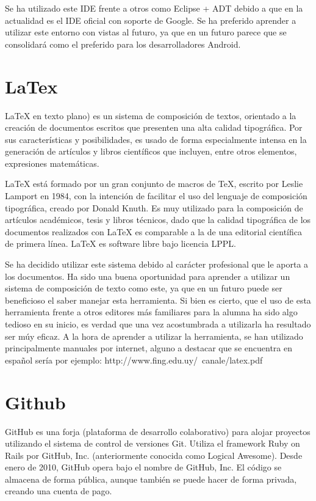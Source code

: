 Se ha utilizado este IDE frente a otros como Eclipse + ADT debido a que en la actualidad es el IDE oficial con soporte de Google. Se ha preferido aprender a utilizar este entorno con vistas al futuro, ya que en un futuro parece que se consolidará como el preferido para los desarrolladores Android.

\section{LaTex}

LaTeX en texto plano) es un sistema de composición de textos, orientado a la creación de documentos escritos que presenten una alta calidad tipográfica. Por sus características y posibilidades, es usado de forma especialmente intensa en la generación de artículos y libros científicos que incluyen, entre otros elementos, expresiones matemáticas.


LaTeX está formado por un gran conjunto de macros de TeX, escrito por Leslie Lamport en 1984, con la intención de facilitar el uso del lenguaje de composición tipográfica, creado por Donald Knuth. Es muy utilizado para la composición de artículos académicos, tesis y libros técnicos, dado que la calidad tipográfica de los documentos realizados con LaTeX es comparable a la de una editorial científica de primera línea. LaTeX es software libre bajo licencia LPPL.


Se ha decidido utilizar este sistema debido al carácter profesional que le aporta a los documentos. Ha sido una buena oportunidad para aprender a utilizar un sistema de composición de texto como este, ya que en un futuro puede ser beneficioso el saber manejar esta herramienta. Si bien es cierto, que el uso de esta herramienta frente a otros editores más familiares para la alumna ha sido algo tedioso en su inicio, es verdad que una vez acostumbrada a utilizarla ha resultado ser múy eficaz. A la hora de aprender a utilizar la herramienta, se han utilizado principalmente manuales por internet, alguno a destacar que se encuentra en español sería por ejemplo: http://www.fing.edu.uy/~canale/latex.pdf

\section{Github}

GitHub es una forja (plataforma de desarrollo colaborativo) para alojar proyectos utilizando el sistema de control de versiones Git. Utiliza el framework Ruby on Rails por GitHub, Inc. (anteriormente conocida como Logical Awesome). Desde enero de 2010, GitHub opera bajo el nombre de GitHub, Inc. El código se almacena de forma pública, aunque también se puede hacer de forma privada, creando una cuenta de pago.


